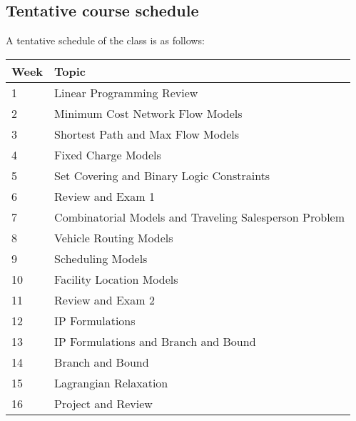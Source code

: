\documentclass[letterpaper,hidelinks,oneside,11pt]{article}%
\begin{document}
\subsection*{Tentative course schedule} 

A tentative schedule of the class is as follows:
\begin{table}[h!]
\centering
\small
\begin{tabular}{l|l}
\textbf{Week} & \textbf{Topic} \\ \hline
1 & Linear Programming Review \\
2 & Minimum Cost Network Flow Models \\
3 & Shortest Path and Max Flow Models \\
4 & Fixed Charge Models \\
5 & Set Covering and Binary Logic Constraints \\
6 & Review and Exam 1 \\
7 & Combinatorial Models and Traveling Salesperson Problem \\
8 & Vehicle Routing Models \\
9 & Scheduling Models \\
10 & Facility Location Models \\
11 & Review and Exam 2 \\
12 & IP Formulations \\
13 & IP Formulations and Branch and Bound \\
14 & Branch and Bound \\
15 & Lagrangian Relaxation \\
16 & Project and Review \\ \hline
\end{tabular}
\end{table}
\end{document}

